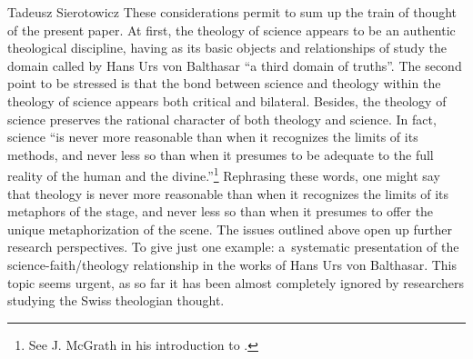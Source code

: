 \begin{artengenv}{Tadeusz Sierotowicz}
These considerations permit to sum up the train of thought of the present paper. At first, the theology of science appears to be an authentic theological discipline, having as its basic objects and relationships of study the domain called by Hans Urs von Balthasar ``a third domain of truths''. The second point to be stressed is that the bond between science and theology within the theology of science appears both critical and bilateral. Besides, the theology of science preserves the rational character of both theology and science. In fact, science ``is never more reasonable than when it recognizes the limits of its methods, and never less so than when it presumes to be adequate to the full reality of the human and the divine.''\footnote{See J. McGrath in his introduction to 
\parencite[][p.5]{lococo_life_2021}. %
 } Rephrasing these words, one might say that theology is never more reasonable than when it recognizes the limits of its metaphors of the stage, and never less so than when it presumes to offer the unique metaphorization of the scene. The issues outlined above open up further research perspectives. To give just one example: a~systematic presentation of the science-faith/theology relationship in the works of Hans Urs von Balthasar. This topic seems urgent, as so far it has been almost completely ignored by researchers studying the Swiss theologian thought.



\end{artengenv}

